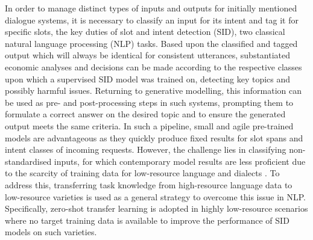 \documentclass[11pt,a4paper,twoside,openright]{scrbook}
\begin{document}
In order to manage distinct types of inputs and outputs for initially mentioned dialogue systems, it is necessary to classify an input for its intent and tag it for specific slots, the key duties of slot and intent detection (SID), two classical natural language processing (NLP) tasks. Based upon the classified and tagged output which will always be identical for consistent utterances, substantiated economic analyses and decisions can be made according to the respective classes upon which a supervised SID model was trained on, detecting key topics and possibly harmful issues. Returning to generative modelling, this information can be used as pre- and post-processing steps in such systems, prompting them to formulate a correct answer on the desired topic and to ensure the generated output meets the same criteria. In such a pipeline, small and agile pre-trained models are advantageous as they quickly produce fixed results for slot spans and intent classes of incoming requests. However, the challenge lies in classifying non-standardised inputs, for which contemporary model results are less proficient due to the scarcity of training data for low-resource language and dialects \citep{Zampieri_Nakov_Scherrer_2020}. To address this, transferring task knowledge from high-resource language data to low-resource varieties is used as a general strategy to overcome this issue in NLP. Specifically, zero-shot transfer learning is adopted in highly low-resource scenarios where no target training data is available to improve the performance of SID models on such varieties.
\end{document}
